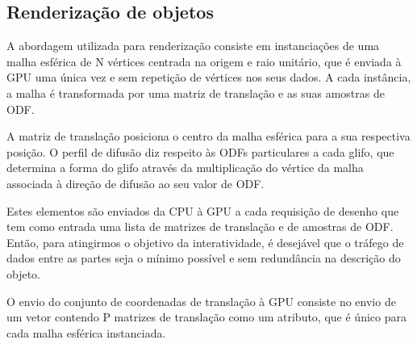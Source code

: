 \documentclass[
    12pt,                %
    oneside,            %
    a4paper,            %
    english,            %
    french,                %
    spanish,            %
    brazil                %
    ]{abntex2}
\begin{document}





\subsection{Renderização de objetos}

A abordagem utilizada para renderização consiste em instanciações de uma malha esférica de N vértices centrada na origem e raio unitário, que é enviada à GPU uma única vez e sem repetição de vértices nos seus dados. A cada instância, a malha é transformada por uma matriz de translação e as suas amostras de ODF.

A matriz de translação posiciona o centro da malha esférica para a sua respectiva posição. O perfil de difusão diz respeito às ODFs particulares a cada glifo, que determina a forma do glifo através da multiplicação do vértice da malha associada à direção de difusão ao seu valor de ODF.

Estes elementos são enviados da CPU à GPU a cada requisição de desenho que tem como entrada uma lista de matrizes de translação e de amostras de ODF. Então, para atingirmos o objetivo da interatividade, é desejável que o tráfego de dados entre as partes seja o mínimo possível e sem redundância na descrição do objeto.

O envio do conjunto de coordenadas de translação à GPU consiste no envio de um vetor contendo P matrizes de translação como um atributo, que é único para cada malha esférica instanciada.
\end{document}
